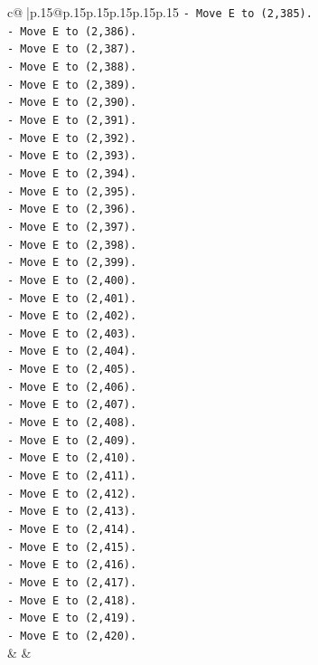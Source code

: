 \documentclass{article}
\begin{document}
{\begin{supertabular}{c@{$\;$}|p{.15\linewidth}@{}p{.15\linewidth}p{.15\linewidth}p{.15\linewidth}p{.15\linewidth}p{.15\linewidth}}
{{{\texttt{{-} Move E to (2,385).} \\
\texttt{{-} Move E to (2,386).} \\
\texttt{{-} Move E to (2,387).} \\
\texttt{{-} Move E to (2,388).} \\
\texttt{{-} Move E to (2,389).} \\
\texttt{{-} Move E to (2,390).} \\
\texttt{{-} Move E to (2,391).} \\
\texttt{{-} Move E to (2,392).} \\
\texttt{{-} Move E to (2,393).} \\
\texttt{{-} Move E to (2,394).} \\
\texttt{{-} Move E to (2,395).} \\
\texttt{{-} Move E to (2,396).} \\
\texttt{{-} Move E to (2,397).} \\
\texttt{{-} Move E to (2,398).} \\
\texttt{{-} Move E to (2,399).} \\
\texttt{{-} Move E to (2,400).} \\
\texttt{{-} Move E to (2,401).} \\
\texttt{{-} Move E to (2,402).} \\
\texttt{{-} Move E to (2,403).} \\
\texttt{{-} Move E to (2,404).} \\
\texttt{{-} Move E to (2,405).} \\
\texttt{{-} Move E to (2,406).} \\
\texttt{{-} Move E to (2,407).} \\
\texttt{{-} Move E to (2,408).} \\
\texttt{{-} Move E to (2,409).} \\
\texttt{{-} Move E to (2,410).} \\
\texttt{{-} Move E to (2,411).} \\
\texttt{{-} Move E to (2,412).} \\
\texttt{{-} Move E to (2,413).} \\
\texttt{{-} Move E to (2,414).} \\
\texttt{{-} Move E to (2,415).} \\
\texttt{{-} Move E to (2,416).} \\
\texttt{{-} Move E to (2,417).} \\
\texttt{{-} Move E to (2,418).} \\
\texttt{{-} Move E to (2,419).} \\
\texttt{{-} Move E to (2,420).} \\
            }
        }
    }
    & & \\ \\


\end{supertabular}}
\end{document}
